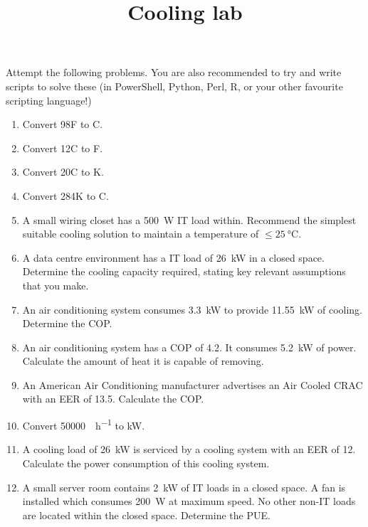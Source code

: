 \documentclass{pgnotes}
\title{Cooling lab}
\begin{document}
\maketitle

Attempt the following problems.
You are also recommended to try and write scripts to solve these (in PowerShell, Python, Perl, R, or your other favourite scripting language!)

\begin{enumerate}

\item
  Convert 98F to C.

\item
  Convert 12C to F.

\item
  Convert 20C to K.

\item
  Convert 284K to C.
  
\item
  A small wiring closet has a \SI{500}{\watt} IT load within.
  Recommend the simplest suitable cooling solution to maintain a temperature of $\le \SI{25}{\celsius}$.

\item
  A data centre environment has a IT load of \SI{26}{\kilo\watt} in a closed space.
  Determine the cooling capacity required, stating key relevant assumptions that you make.
  
\item
  An air conditioning system consumes \SI{3.3}{\kilo\watt} to provide \SI{11.55}{\kilo\watt} of cooling.
  Determine the COP.
  
\item 
  An air conditioning system has a COP of 4.2.
  It consumes \SI{5.2}{\kilo\watt} of power.
  Calculate the amount of heat it is capable of removing.

\item
  An American Air Conditioning manufacturer advertises an Air Cooled CRAC with an EER of 13.5.
  Calculate the COP. %
  
\item
  Convert \SI{50000}{\BTU\per\hour} to \si{\kilo\watt}.

\item
  A cooling load of \SI{26}{\kilo\watt} is serviced by a cooling system with an EER of 12.
  Calculate the power consumption of this cooling system.

\item
  A small server room contains \SI{2}{\kilo\watt} of IT loads in a closed space.
  A fan is installed which consumes \SI{200}{\watt} at maximum speed.
  No other non-IT loads are located within the closed space.
  Determine the PUE. 


\end{enumerate}
\end{document}
